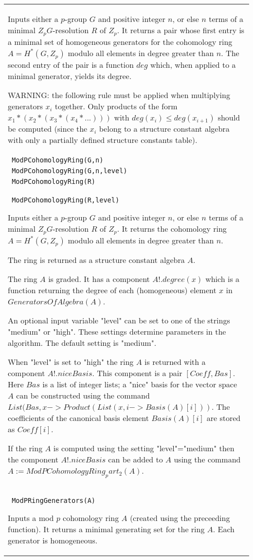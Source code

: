 \documentclass[a4paper,11pt]{report}
\begin{document}
{\begin{center}
\begin{tabular}{|l|}
 Inputs either a $p$-group $G$ and positive integer $n$, or else $n$ terms of a minimal $Z_pG$-resolution $R$ of $Z_p$. It returns a pair whose first entry is a minimal set of homogeneous
generators for the cohomology ring $A=H^*(G,Z_p)$ modulo all elements in degree greater than $n$. The second entry of the pair is a function $deg$ which, when applied to a minimal generator, yields its degree. 

 WARNING: the following rule must be applied when multiplying generators $x_i$ together. Only products of the form $x_1*(x_2*(x_3*(x_4*...)))$ with $deg(x_i) \le deg(x_{i+1})$ should be computed (since the $x_i$ belong to a structure constant algebra with only a partially defined structure
constants table). \\
 \index{ModPCohomologyRing} \texttt{ ModPCohomologyRing(G,n) } \\
 \texttt{ ModPCohomologyRing(G,n,level) } \\
 \texttt{ ModPCohomologyRing(R) } \\
 \texttt{ ModPCohomologyRing(R,level) } 

 Inputs either a $p$-group $G$ and positive integer $n$, or else $n$ terms of a minimal $Z_pG$-resolution $R$ of $Z_p$. It returns the cohomology ring $A=H^*(G,Z_p)$ modulo all elements in degree greater than $n$. 

 The ring is returned as a structure constant algebra $A$. 

 The ring $A$ is graded. It has a component $A!.degree(x)$ which is a function returning the degree of each (homogeneous) element $x$ in $GeneratorsOfAlgebra(A)$. 

 An optional input variable "level" can be set to one of the strings "medium"
or "high". These settings determine parameters in the algorithm. The default
setting is "medium". 

 When "level" is set to "high" the ring $A$ is returned with a component $A!.niceBasis$. This component is a pair $[Coeff,Bas]$. Here $Bas$ is a list of integer lists; a "nice" basis for the vector space $A$ can be constructed using the command $List(Bas,x->Product(List(x,i->Basis(A)[i]))$. The coefficients of the canonical basis element $Basis(A)[i]$ are stored as $Coeff[i]$. 

 If the ring $A$ is computed using the setting "level"="medium" then the component $A!.niceBasis$ can be added to $A$ using the command $ A:=ModPCohomologyRing_part_2(A) $. \\
 \index{ModPRingGenerators} \texttt{ ModPRingGenerators(A) } 

 Inputs a mod $p$ cohomology ring $A$ (created using the preceeding function). It returns a minimal generating set
for the ring $A$. Each generator is homogeneous. \\
\end{tabular}\\[2mm]
\end{center}

 }
\end{document}
